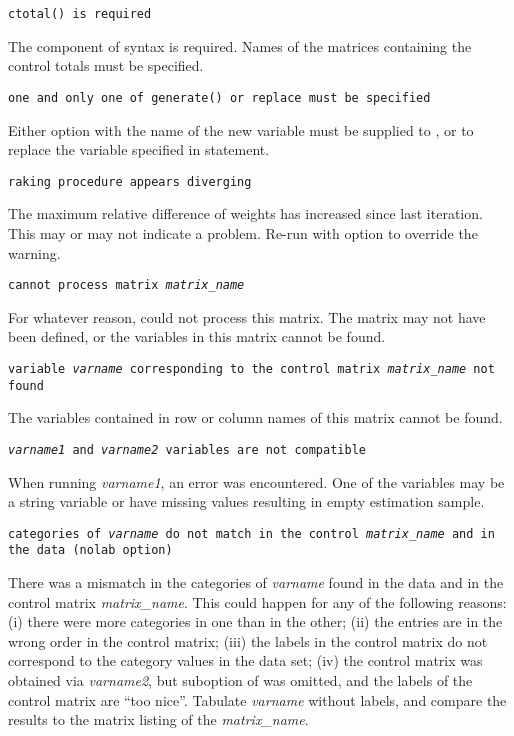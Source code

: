 \noindent
    {\tt ctotal() is required}

    \morehang
    The  component of 
    syntax is required. Names of the matrices containing the
    control totals must be specified.

    \noindent
    {\tt one and only one of generate() or replace must be specified}

    \morehang
    Either  option with the name of the new variable
    must be supplied to , or  to replace
    the variable specified in \stcmd{[pw=\ldots]} statement.

    \noindent
    {\tt raking procedure appears diverging}

    \morehang
    The maximum relative difference of weights has increased since last
    iteration. This may or may not indicate a problem. Re-run 
    with  option to override the warning.

    \noindent
    {\tt cannot process matrix {\it matrix{\_}name}}

    \morehang
    For whatever reason,  could not process this matrix.
    The matrix may not have been defined, or the variables in this matrix
    cannot be found.

    \noindent
    {\tt variable {\it varname} corresponding to the control matrix
    {\it matrix{\_}name} not found}

    \morehang
    The variables contained in row or column names of this matrix
    cannot be found.

    \noindent
    {\tt {\it varname1} and {\it varname2} variables are not compatible}

    \morehang
    When running  {\it varname1}\stcmd{)},
    an error was encountered. One of the variables may be a string variable
    or have missing values resulting in empty estimation sample.

    \noindent
    {\tt categories of {\it varname} do not match in the control {\it matrix{\_}name}
    and in the data (nolab option)}

    \morehang
    There was a mismatch in the categories of {\it varname} found in the data
    and in the control matrix {\it matrix{\_}name}. This could happen for any of the
    following reasons: (i) there were more categories in one than in the other;
    (ii) the entries are in the wrong order in the control matrix; (iii) the labels
    in the control matrix do not correspond to the category values in the data set;
    (iv) the control matrix was obtained via 
    {\it varname2}\stcmd{)}, but  suboption
    of  was omitted, and the labels of the control matrix are
    ``too nice''. Tabulate {\it varname} without labels, and compare the results
    to the matrix listing of the {\it matrix{\_}name}.

